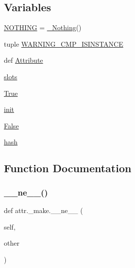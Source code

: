 \subsection*{Variables}
\begin{DoxyCompactItemize}
\item 
\hyperlink{namespaceattr_1_1__make_a4b0e597eb2f1bb453e7502bf9e1ec615}{N\+O\+T\+H\+I\+NG} = \hyperlink{classattr_1_1__make_1_1___nothing}{\+\_\+\+Nothing}()
\item 
tuple \hyperlink{namespaceattr_1_1__make_a72bd38fa1b2f5aa880aed69ddf1e10cb}{W\+A\+R\+N\+I\+N\+G\+\_\+\+C\+M\+P\+\_\+\+I\+S\+I\+N\+S\+T\+A\+N\+CE}
\item 
def \hyperlink{namespaceattr_1_1__make_ac510a4d2982a3b5968875d946197801c}{Attribute}
\item 
\hyperlink{namespaceattr_1_1__make_a3179af049217b622fd43d09b50f2d6fb}{slots}
\item 
\hyperlink{namespaceattr_1_1__make_a2574ed57c67459b7e6bcc4e40da338f3}{True}
\item 
\hyperlink{namespaceattr_1_1__make_afb414d36bf2a925437c74a78ed53b431}{init}
\item 
\hyperlink{namespaceattr_1_1__make_a65fcd916433aa9a30f9711503366982e}{False}
\item 
\hyperlink{namespaceattr_1_1__make_a669b2aad68738f520370d3236455673b}{hash}
\end{DoxyCompactItemize}


\subsection{Function Documentation}
\mbox{\label{namespaceattr_1_1__make_ac708a1f410f2045b7e529df589a9d845}} 
\subsubsection{\texorpdfstring{\+\_\+\+\_\+ne\+\_\+\+\_\+()}{\_\_ne\_\_()}}
{\footnotesize\ttfamily def attr.\+\_\+make.\+\_\+\+\_\+ne\+\_\+\+\_\+ (\begin{DoxyParamCaption}\item[{}]{self,  }\item[{}]{other }\end{DoxyParamCaption})}

